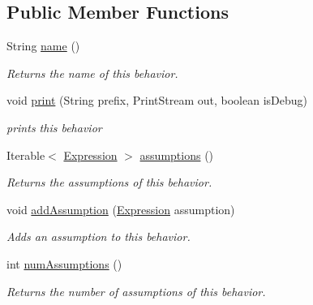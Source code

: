 \subsection*{Public Member Functions}
\begin{DoxyCompactItemize}
\item 
String \hyperlink{interfaceedu_1_1udel_1_1cis_1_1vsl_1_1civl_1_1model_1_1IF_1_1contract_1_1NamedFunctionBehavior_a97c5141754bf1fa6aeb0a6bc5d6d778c}{name} ()
\begin{DoxyCompactList}\small\item\em Returns the name of this behavior. \end{DoxyCompactList}\item 
void \hyperlink{interfaceedu_1_1udel_1_1cis_1_1vsl_1_1civl_1_1model_1_1IF_1_1contract_1_1NamedFunctionBehavior_abf6d930679400632ffbe71bf79633173}{print} (String prefix, Print\+Stream out, boolean is\+Debug)
\begin{DoxyCompactList}\small\item\em prints this behavior \end{DoxyCompactList}\item 
Iterable$<$ \hyperlink{interfaceedu_1_1udel_1_1cis_1_1vsl_1_1civl_1_1model_1_1IF_1_1expression_1_1Expression}{Expression} $>$ \hyperlink{interfaceedu_1_1udel_1_1cis_1_1vsl_1_1civl_1_1model_1_1IF_1_1contract_1_1NamedFunctionBehavior_a9152b13e5697ff2c4594538f6fb948bb}{assumptions} ()
\begin{DoxyCompactList}\small\item\em Returns the assumptions of this behavior. \end{DoxyCompactList}\item 
void \hyperlink{interfaceedu_1_1udel_1_1cis_1_1vsl_1_1civl_1_1model_1_1IF_1_1contract_1_1NamedFunctionBehavior_aa11efd324fe3735df21fe06a2ba4d506}{add\+Assumption} (\hyperlink{interfaceedu_1_1udel_1_1cis_1_1vsl_1_1civl_1_1model_1_1IF_1_1expression_1_1Expression}{Expression} assumption)
\begin{DoxyCompactList}\small\item\em Adds an assumption to this behavior. \end{DoxyCompactList}\item 
int \hyperlink{interfaceedu_1_1udel_1_1cis_1_1vsl_1_1civl_1_1model_1_1IF_1_1contract_1_1NamedFunctionBehavior_a58c983b74b9fc54a64c5a8e0f56ed37e}{num\+Assumptions} ()
\begin{DoxyCompactList}\small\item\em Returns the number of assumptions of this behavior. \end{DoxyCompactList}\end{DoxyCompactItemize}


